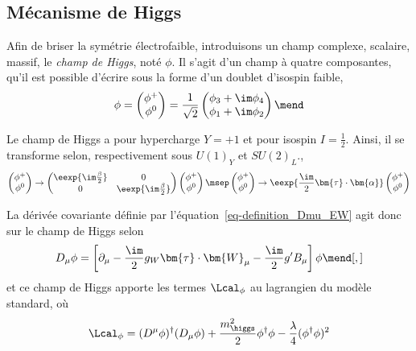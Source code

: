 \subsection{Mécanisme de Higgs}\label{chapter-MS-MSSM-section-formalisme-subsec-Higgs_mechanism}
Afin de briser la symétrie électrofaible, introduisons un champ complexe, scalaire, massif, le \emph{champ de Higgs}, noté $\phi$. Il s'agit d'un champ à quatre composantes, qu'il est possible d'écrire sous la forme d'un doublet d'isospin faible,
\begin{equation}
\phi
=
\begin{pmatrix}
\phi^+ \\ \phi^0
\end{pmatrix}
=
\frac{1}{\sqrt{2}}
\begin{pmatrix}
\phi_3 + \im \phi_4 \\ \phi_1 + \im \phi_2
\end{pmatrix}
\mend
\end{equation}
\par Le champ de Higgs a pour hypercharge $Y=+1$ et pour isospin $I=\frac{1}{2}$. Ainsi, il se transforme selon, respectivement sous $U(1)_Y$ et $SU(2)_L$.,
\begin{equation}
\begin{pmatrix}
\phi^+ \\ \phi^0
\end{pmatrix}
\to
\begin{pmatrix}
\eexp{\im\frac{\beta}{2}} & 0 \\ 0 & \eexp{\im\frac{\beta}{2}}
\end{pmatrix}
\begin{pmatrix}
\phi^+ \\ \phi^0
\end{pmatrix}
\msep
\begin{pmatrix}
\phi^+ \\ \phi^0
\end{pmatrix}
\to
\eexp{\frac{\im}{2}\bm{\tau}\cdot\bm{\alpha}}
\begin{pmatrix}
\phi^+ \\ \phi^0
\end{pmatrix}
\end{equation}
\par La dérivée covariante définie par l'équation~\eqref{eq-definition_Dmu_EW} agit donc sur le champ de Higgs selon
\begin{equation}
D_\mu \phi = \left[ \partial_\mu - \frac{\im}{2}g_W \bm{\tau}\cdot\bm{W}_\mu - \frac{\im}{2}g'B_\mu \right] \phi
\mend[,]
\end{equation}
et ce champ de Higgs apporte les termes $\Lcal_\phi$ au lagrangien du modèle standard, où
\begin{equation}
\Lcal_\phi = (D^\mu\phi)^\dagger(D_\mu\phi) + \frac{m^2_{\higgs}}{2}\phi^\dagger\phi-\frac{\lambda}{4}(\phi^\dagger\phi)^2
\end{equation}